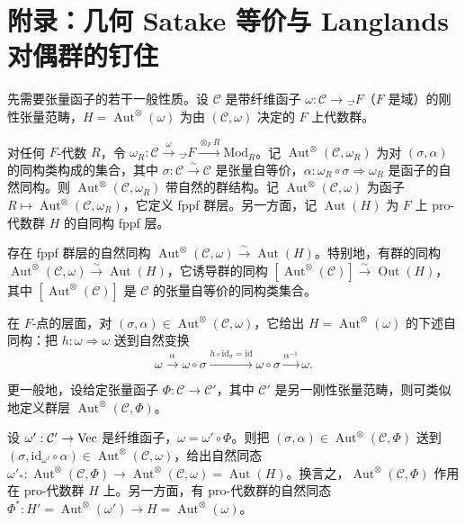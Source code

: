 
\section{附录：几何 Satake 等价与 Langlands 对偶群的钉住}

先需要张量函子的若干一般性质。设 $\mathcal C$ 是带纤维函子 $\omega:\mathcal C\to\Vec_F$（$F$ 是域）的刚性张量范畴，$H=\operatorname{Aut}^\otimes(\omega)$ 为由 $(\mathcal C,\omega)$ 决定的 $F$ 上代数群。

对任何 $F$-代数 $R$，令 $\omega_R:\mathcal C\xrightarrow{\omega}\Vec_F\xrightarrow{\otimes_FR}\mathrm{Mod}_R$。记 $\operatorname{Aut}^\otimes(\mathcal C,\omega_R)$ 为对 $(\sigma,\alpha)$ 的同构类构成的集合，其中 $\sigma:\mathcal C\xrightarrow{\sim}\mathcal C$ 是张量自等价，$\alpha:\omega_R\circ\sigma\Rightarrow\omega_R$ 是函子的自然同构。则 $\operatorname{Aut}^\otimes(\mathcal C,\omega_R)$ 带自然的群结构。记 $\operatorname{Aut}^\otimes(\mathcal C,\omega)$ 为函子 $R\mapsto\operatorname{Aut}^\otimes(\mathcal C,\omega_R)$，它定义 fppf 群层。另一方面，记 $\operatorname{Aut}(H)$ 为 $F$ 上 pro-代数群 $H$ 的自同构 fppf 层。

\begin{lemma}
存在 fppf 群层的自然同构 $\operatorname{Aut}^\otimes(\mathcal C,\omega)\xrightarrow{\sim}\operatorname{Aut}(H)$。特别地，有群的同构 $\operatorname{Aut}^\otimes(\mathcal C,\omega)\xrightarrow{\sim}\operatorname{Aut}(H)$，它诱导群的同构 $[\operatorname{Aut}^\otimes(\mathcal C)]\xrightarrow{\sim}\operatorname{Out}(H)$，其中 $[\operatorname{Aut}^\otimes(\mathcal C)]$ 是 $\mathcal C$ 的张量自等价的同构类集合。
\end{lemma}

在 $F$-点的层面，对 $(\sigma,\alpha)\in\operatorname{Aut}^\otimes(\mathcal C,\omega)$，它给出 $H=\operatorname{Aut}^\otimes(\omega)$ 的下述自同构：把 $h:\omega\Rightarrow\omega$ 送到自然变换
\[
\omega\xrightarrow{\alpha}\omega\circ\sigma\xrightarrow{h\circ\mathrm{id}_\sigma=\mathrm{id}}\omega\circ\sigma\xrightarrow{\alpha^{-1}}\omega.
\]

更一般地，设给定张量函子 $\Phi:\mathcal C\to\mathcal C'$，其中 $\mathcal C'$ 是另一刚性张量范畴，则可类似地定义群层 $\operatorname{Aut}^\otimes(\mathcal C,\Phi)$。

设 $\omega':\mathcal C'\to\Vec$ 是纤维函子，$\omega=\omega'\circ\Phi$。则把 $(\sigma,\alpha)\in\operatorname{Aut}^\otimes(\mathcal C,\Phi)$ 送到 $(\sigma,\mathrm{id}_{\omega'}\circ\alpha)\in\operatorname{Aut}^\otimes(\mathcal C,\omega)$，给出自然同态 $\omega'_*:\operatorname{Aut}^\otimes(\mathcal C,\Phi)\to\operatorname{Aut}^\otimes(\mathcal C,\omega)=\operatorname{Aut}(H)$。换言之，$\operatorname{Aut}^\otimes(\mathcal C,\Phi)$ 作用在 pro-代数群 $H$ 上。另一方面，有 pro-代数群的自然同态 $\Phi^*:H'=\operatorname{Aut}^\otimes(\omega')\to H=\operatorname{Aut}^\otimes(\omega)$。


